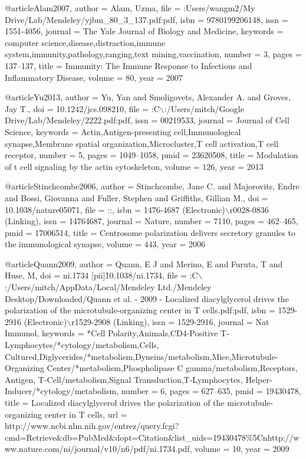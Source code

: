 @article{Alam2007,
author = {Alam, Uzma},
file = {:Users/wangm2/My Drive/Lab/Mendeley/yjbm_80_3_137.pdf:pdf},
isbn = {9780199206148},
issn = {1551-4056},
journal = {The Yale Journal of Biology and Medicine},
keywords = {computer science,disease,distraction,immune system,immunity,pathology,ranging,text mining,vaccination},
number = {3},
pages = {137--137},
title = {{Immunity: The Immune Response to Infectious and Inflammatory Disease}},
volume = {80},
year = {2007}
}

@article{Yu2013,
author = {Yu, Yan and Smoligovets, Alexander A. and Groves, Jay T.},
doi = {10.1242/jcs.098210},
file = {:C$\backslash$:/Users/mitch/Google Drive/Lab/Mendeley/2222.pdf:pdf},
issn = {00219533},
journal = {Journal of Cell Science},
keywords = {Actin,Antigen-presenting cell,Immunological synapse,Membrane spatial organization,Microcluster,T cell activation,T cell receptor},
number = {5},
pages = {1049--1058},
pmid = {23620508},
title = {{Modulation of t cell signaling by the actin cytoskeleton}},
volume = {126},
year = {2013}
}

@article{Stinchcombe2006,
author = {Stinchcombe, Jane C. and Majorovits, Endre and Bossi, Giovanna and Fuller, Stephen and Griffiths, Gillian M.},
doi = {10.1038/nature05071},
file = {::},
isbn = {1476-4687 (Electronic)$\backslash$r0028-0836 (Linking)},
issn = {14764687},
journal = {Nature},
number = {7110},
pages = {462--465},
pmid = {17006514},
title = {{Centrosome polarization delivers secretory granules to the immunological synapse}},
volume = {443},
year = {2006}
}

@article{Quann2009,
author = {Quann, E J and Merino, E and Furuta, T and Huse, M},
doi = {ni.1734 [pii]\r10.1038/ni.1734},
file = {:C$\backslash$:/Users/mitch/AppData/Local/Mendeley Ltd./Mendeley Desktop/Downloaded/Quann et al. - 2009 - Localized diacylglycerol drives the polarization of the microtubule-organizing center in T cells.pdf:pdf},
isbn = {1529-2916 (Electronic)$\backslash$r1529-2908 (Linking)},
issn = {1529-2916},
journal = {Nat Immunol},
keywords = {*Cell Polarity,Animals,CD4-Positive T-Lymphocytes/*cytology/metabolism,Cells, Cultured,Diglycerides/*metabolism,Dyneins/metabolism,Mice,Microtubule-Organizing Center/*metabolism,Phospholipase C gamma/metabolism,Receptors, Antigen, T-Cell/metabolism,Signal Transduction,T-Lymphocytes, Helper-Inducer/*cytology/metabolism},
number = {6},
pages = {627--635},
pmid = {19430478},
title = {{Localized diacylglycerol drives the polarization of the microtubule-organizing center in T cells}},
url = {http://www.ncbi.nlm.nih.gov/entrez/query.fcgi?cmd=Retrieve{\&}db=PubMed{\&}dopt=Citation{\&}list{\_}uids=19430478{\%}5Cnhttp://www.nature.com/ni/journal/v10/n6/pdf/ni.1734.pdf},
volume = {10},
year = {2009}
}

